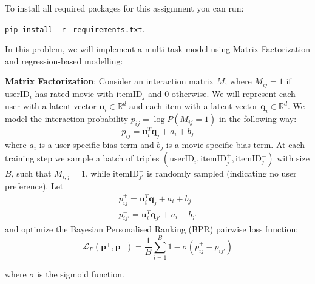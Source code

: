 \documentclass[12pt]{article}
\begin{document}
To install all required packages for this assignment you can run:

\texttt{pip install -r} \texttt{ requirements.txt}.




\noindent In this problem, we will implement a multi-task model using Matrix Factorization \cite{Yehuda2009matrix} and regression-based modelling:

\vspace{0.2cm}

\noindent\textbf{Matrix Factorization}: Consider an interaction matrix $M$, where $M_{ij} = 1$ if $\text{userID}_i$ has rated movie with $\text{itemID}_j$ and $0$ otherwise. We will represent each user with a latent vector $\mathbf{u}_i\in\mathbb{R}^d$ and each item with a latent vector $\mathbf{q}_i\in\mathbb{R}^d$. We model the interaction probability $p_{ij}=\log P(M_{ij}=1)$ in the following way:
\begin{equation}
    p_{ij} = \mathbf{u}_i^T\mathbf{q}_j + a_i + b_j
    \label{eq:prob}
\end{equation}
where $a_i$ is a user-specific bias term and $b_j$ is a movie-specific bias term. At each training step we sample a batch of triples $(\text{userID}_i, \text{itemID}_j^+, \text{itemID}_{j'}^-)$ with size $B$, such that $M_{i, j} = 1$, while $\text{itemID}_{j'}^-$ is randomly sampled (indicating no user preference). Let
\begin{equation} 
\begin{split}
p^+_{ij} =  \mathbf{u}_i^T\mathbf{q}_j + a_i + b_j \\
p^-_{ij'} =  \mathbf{u}_i^T\mathbf{q}_{j'} + a_i + b_{j'}
\end{split}
\label{eq:p}
\end{equation}
and optimize the  Bayesian Personalised Ranking (BPR) \cite{Rendle2009BPR} pairwise loss function:
\begin{equation}
    \mathcal{L}_F(\mathbf{p}^+, \mathbf{p}^-)=\frac{1}{B}\sum_{i=1}^B 1-\sigma(p_{ij}^+-p_{ij'}^-)
    \label{eq:l1}
\end{equation}

\noindent where $\sigma$ is the sigmoid function.

\vspace{0.2cm}
\end{document}
